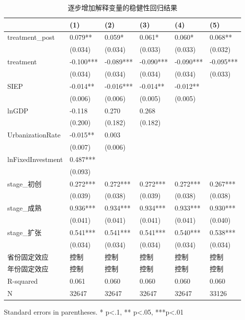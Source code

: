 \begin{table}
\caption{逐步增加解释变量的稳健性回归结果}
\label{}
\begin{center}
\begin{tabular}{llllll}
\hline
                  & (1)       & (2)       & (3)       & (4)       & (5)        \\
\hline
treatment\_post   & 0.079**   & 0.059*    & 0.061*    & 0.060*    & 0.068**    \\
                  & (0.034)   & (0.034)   & (0.033)   & (0.033)   & (0.032)    \\
treatment         & -0.100*** & -0.089*** & -0.090*** & -0.090*** & -0.095***  \\
                  & (0.034)   & (0.034)   & (0.034)   & (0.034)   & (0.033)    \\
SIEP            & -0.014**  & -0.016*** & -0.014**  & -0.012**  &            \\
                  & (0.006)   & (0.006)   & (0.005)   & (0.005)   &            \\
lnGDP             & -0.118    & 0.270     & 0.268     &           &            \\
                  & (0.200)   & (0.182)   & (0.182)   &           &            \\
UrbanizationRate              & -0.015**  & 0.003     &           &           &            \\
                  & (0.007)   & (0.006)   &           &           &            \\
lnFixedInvestment & 0.487***  &           &           &           &            \\
                  & (0.093)   &           &           &           &            \\
stage\_初创         & 0.272***  & 0.272***  & 0.272***  & 0.272***  & 0.267***   \\
                  & (0.039)   & (0.038)   & (0.039)   & (0.038)   & (0.038)    \\
stage\_成熟         & 0.936***  & 0.934***  & 0.934***  & 0.933***  & 0.930***   \\
                  & (0.041)   & (0.041)   & (0.041)   & (0.041)   & (0.040)    \\
stage\_扩张         & 0.541***  & 0.541***  & 0.541***  & 0.540***  & 0.538***   \\
                  & (0.034)   & (0.034)   & (0.034)   & (0.034)   & (0.034)    \\
省份固定效应  & 控制 & 控制 & 控制 & 控制 & 控制 \\ 
 年份固定效应  & 控制 & 控制 & 控制 & 控制 & 控制 \\ 
\hline

R-squared         & 0.061     & 0.060     & 0.060     & 0.060     & 0.060      \\
N                 & 32647     & 32647     & 32647     & 32647     & 33126      \\
\hline
\end{tabular}
\end{center}
\end{table}
\bigskip
Standard errors in parentheses. \newline 
* p<.1, ** p<.05, ***p<.01

